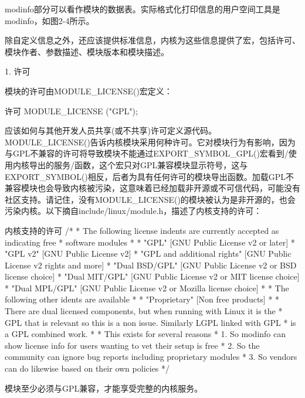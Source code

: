\documentclass[lang=cn,newtx,10pt,scheme=chinese]{elegantbook}
\begin{document}
modinfo部分可以看作模块的数据表。实际格式化打印信息的用户空间工具是modinfo，如图2-4所示。

除自定义信息之外，还应该提供标准信息，内核为这些信息提供了宏，包括许可、模块作者、参数描述、模块版本和模块描述。

1. 许可

模块的许可由MODULE\_LICENSE()宏定义：

\begin{mycode}{许可}
MODULE_LICENSE ("GPL");
\end{mycode}

应该如何与其他开发人员共享(或不共享)许可定义源代码。MODULE\_LICENSE()告诉内核模块采用何种许可。它对模块行为有影响，因为与GPL不兼容的许可将导致模块不能通过EXPORT\_SYMBOL\_GPL()宏看到/使用内核导出的服务/函数，这个宏只对GPL兼容模块显示符号，这与EXPORT\_SYMBOL()相反，后者为具有任何许可的模块导出函数。加载GPL不兼容模块也会导致内核被污染，这意味着已经加载非开源或不可信代码，可能没有社区支持。请记住，没有MODULE\_LICENSE()的模块被认为是非开源的，也会污染内核。以下摘自include/linux/module.h，描述了内核支持的许可：

\begin{mycode}{内核支持的许可}
/*
* The following license indents are currently accepted as indicating free
* software modules
*
* "GPL"                              [GNU Public License v2 or later]
* "GPL v2"                           [GNU Public License v2]
* "GPL and additional rights"        [GNU Public License v2 rights and more]
* "Dual BSD/GPL"                     [GNU Public License v2 or BSD license choice]
* "Dual MIT/GPL"                     [GNU Public License v2 or MIT license choice]
* "Dual MPL/GPL"                     [GNU Public License v2 or Mozilla license choice]
*
* The following other idents are available
*
* "Proprietary"                      [Non free products]
*
* There are dual licensed components, but when running with Linux it is the
* GPL that is relevant so this is a non issue. Similarly LGPL linked with GPL
* is a GPL combined work.
*
* This exists for several reasons
* 1. So modinfo can show license info for users wanting to vet their setup is free
* 2. So the community can ignore bug reports including proprietary modules
* 3. So vendors can do likewise based on their own policies
*/
\end{mycode}

\begin{marker}
    模块至少必须与GPL兼容，才能享受完整的内核服务。
\end{marker}
\end{document}
